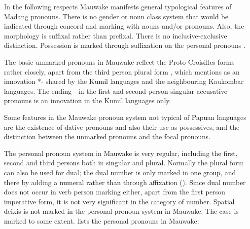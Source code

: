 In the following respects Mauwake manifests general typological features of  Madang pronouns. There is no gender or noun class system that would be indicated through concord and marking with nouns and/or pronouns. Also, the morphology is suffixal rather than prefixal. There is no inclusive-exclusive distinction. Possession is marked through suffixation on the personal pronouns \citep[40--42]{Wurm1982}. 

The basic unmarked pronouns in Mauwake reflect the Proto Croisilles forms rather closely, apart from the third person plural form , which \citet[23]{Ross1996} mentions as an innovation *- shared by the Kumil languages and the neighbouring Kaukombar languages. The ending - in the first and second person singular accusative pronouns is an innovation in the Kumil languages only. 

Some features in the Mauwake pronoun system not typical of Papuan languages are the existence of dative pronouns and also their use as possessives, and the distinction between the unmarked pronouns and the focal pronouns. 

The personal pronoun system in Mauwake is very regular, including the first, second and third persons both in singular and plural. Normally the plural form can also be used for dual; the dual number is only marked in one group, and there by adding a numeral rather than through affixation (). Since dual number does not occur in verb person marking either, apart from the first person imperative form, it is not very significant in the category of number. Spatial deixis is not marked in the personal pronoun system in Mauwake. The case is marked to some extent.  lists the personal pronouns in Mauwake:

